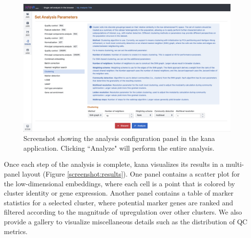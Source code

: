 \documentclass{article}
\begin{document}
\begin{figure}[htbp]
\begin{center}
\includegraphics[width=\textwidth]{screenshots/analysis.png}
\end{center}
\caption{Screenshot showing the analysis configuration panel in the kana application.
Clicking ``Analyze" will perform the entire analysis.}
\label{screenshot:analysis}
\end{figure}

Once each step of the analysis is complete, kana visualizes its results in a multi-panel layout (Figure \ref{screenshot:results}).
One panel contains a scatter plot for the low-dimensional embeddings, where each cell is a point that is colored by cluster identity or gene expression.
Another panel contains a table of marker statistics for a selected cluster, where potential marker genes are ranked and filtered according to the magnitude of upregulation over other clusters.
We also provide a gallery to visualize miscellaneous details such as the distribution of QC metrics.
\end{document}
